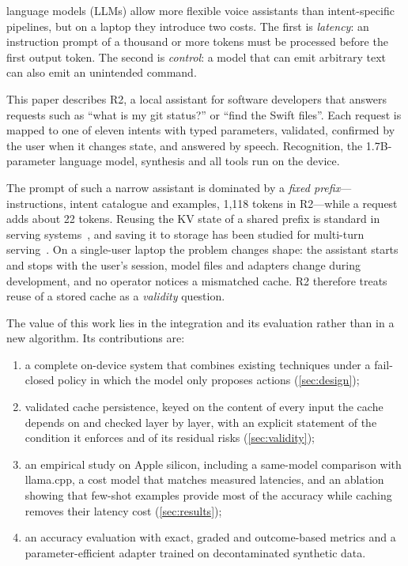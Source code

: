 \documentclass[journal]{IEEEtran}
\theoremstyle{definition}
\begin{document}
 language models (LLMs) allow more flexible voice assistants than
intent-specific pipelines, but on a laptop they introduce two costs. The first is
\emph{latency}: an instruction prompt of a thousand or more tokens must be processed before the
first output token. The second is \emph{control}: a model that can emit arbitrary text can also emit
an unintended command.

This paper describes R2, a local assistant for software developers that answers requests such as
``what is my git status?'' or ``find the Swift files''. Each request is mapped to one of eleven
intents with typed parameters, validated, confirmed by the user when it changes state, and answered
by speech. Recognition, the 1.7B-parameter language model, synthesis and all tools run on the
device.

The prompt of such a narrow assistant is dominated by a \emph{fixed prefix}---instructions, intent
catalogue and examples, 1{,}118 tokens in R2---while a request adds about 22 tokens. Reusing the KV
state of a shared prefix is standard in serving
systems~\cite{kwon2023pagedattention,zheng2024sglang,gim2024promptcache}, and saving it to storage
has been studied for multi-turn serving~\cite{gao2024cachedattention,cheng2025lmcache}. On a
single-user laptop the problem changes shape: the assistant starts and stops with the user's
session, model files and adapters change during development, and no operator notices a mismatched
cache. R2 therefore treats reuse of a stored cache as a \emph{validity} question.

The value of this work lies in the integration and its evaluation rather than in a new algorithm.
Its contributions are:
\begin{enumerate}
\item a complete on-device system that combines existing techniques under a fail-closed policy in
  which the model only proposes actions (\cref{sec:design});
\item validated cache persistence, keyed on the content of every input the cache depends on and
  checked layer by layer, with an explicit statement of the condition it enforces and of its
  residual risks (\cref{sec:validity});
\item an empirical study on Apple silicon, including a same-model comparison with llama.cpp, a cost
  model that matches measured latencies, and an ablation showing that few-shot examples provide
  most of the accuracy while caching removes their latency cost (\cref{sec:results});
\item an accuracy evaluation with exact, graded and outcome-based metrics and a parameter-efficient
  adapter trained on decontaminated synthetic data.
\end{enumerate}
\end{document}
